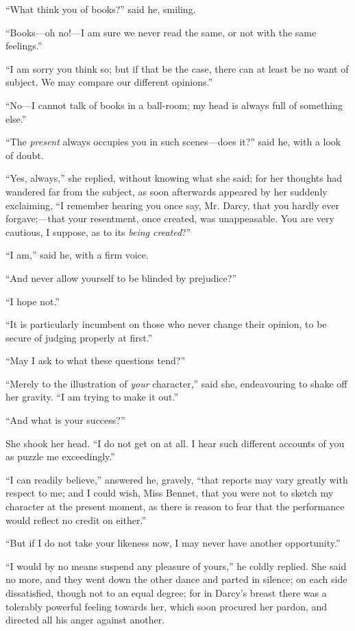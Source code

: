 ``What think you of books?'' said he, smiling.

``Books---oh no!---I am sure we never read the same, or not with the same feelings.''

``I am sorry you think so; but if that be the case, there can at least be no want of subject. We may compare our different opinions.''

``No---I cannot talk of books in a ball-room; my head is always full of something else.''

``The \textit{present} always occupies you in such scenes---does it?'' said he, with a look of doubt.

``Yes, always,'' she replied, without knowing what she said; for her thoughts had wandered far from the subject, as soon afterwards appeared by her suddenly exclaiming, ``I remember hearing you once say, Mr. Darcy, that you hardly ever forgave;---that your resentment, once created, was unappeasable. You are very cautious, I suppose, as to its \textit{being created}?''

``I am,'' said he, with a firm voice.

``And never allow yourself to be blinded by prejudice?''

``I hope not.''

``It is particularly incumbent on those who never change their opinion, to be secure of judging properly at first.''

``May I ask to what these questions tend?''

``Merely to the illustration of \textit{your} character,'' said she, endeavouring to shake off her gravity. ``I am trying to make it out.''

``And what is your success?''

She shook her head. ``I do not get on at all. I hear such different accounts of you as puzzle me exceedingly.''

``I can readily believe,'' answered he, gravely, ``that reports may vary greatly with respect to me; and I could wish, Miss Bennet, that you were not to sketch my character at the present moment, as there is reason to fear that the performance would reflect no credit on either.''

``But if I do not take your likeness now, I may never have another opportunity.''

``I would by no means suspend any pleasure of yours,'' he coldly replied. She said no more, and they went down the other dance and parted in silence; on each side dissatisfied, though not to an equal degree; for in Darcy's breast there was a tolerably powerful feeling towards her, which soon procured her pardon, and directed all his anger against another.

